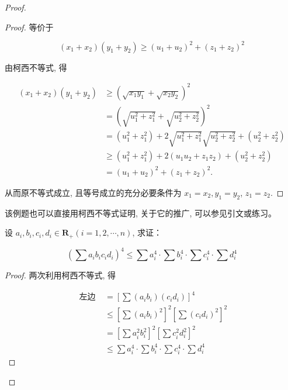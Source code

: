 \begin{proof}
\begin{proof}
	等价于
	
	$$
	\left(x_{1}+x_{2}\right)\left(y_{1}+y_{2}\right) \geqslant\left(u_{1}+u_{2}\right)^{2}+\left(z_{1}+z_{2}\right)^{2}
	$$
	
	由柯西不等式, 得
	
	$$
	\begin{aligned}
	\left(x_{1}+x_{2}\right)\left(y_{1}+y_{2}\right) & \geqslant\left(\sqrt{x_{1} y_{1}}+\sqrt{x_{2} y_{2}}\right)^{2} \\
	& =\left(\sqrt{u_{1}^{2}+z_{1}^{2}}+\sqrt{u_{2}^{2}+z_{2}^{2}}\right)^{2} \\
	& =\left(u_{1}^{2}+z_{1}^{2}\right)+2 \sqrt{u_{1}^{2}+z_{1}^{2}} \sqrt{u_{2}^{2}+z_{2}^{2}}+\left(u_{2}^{2}+z_{2}^{2}\right) \\
	& \geqslant\left(u_{1}^{2}+z_{1}^{2}\right)+2\left(u_{1} u_{2}+z_{1} z_{2}\right)+\left(u_{2}^{2}+z_{2}^{2}\right) \\
	& =\left(u_{1}+u_{2}\right)^{2}+\left(z_{1}+z_{2}\right)^{2} .
	\end{aligned}
	$$
	
	从而原不等式成立, 且等号成立的充分必要条件为 $x_{1}=x_{2}, y_{1}=y_{2}$, $z_{1}=z_{2}$.
\end{proof}
\begin{note}
	该例题也可以直接用柯西不等式证明, 关于它的推广, 可以参见引文或练习。
\end{note}

\begin{example}
	设 $a_{i}, b_{i}, c_{i}, d_{i} \in \mathbf{R}_{+}(i=1,2, \cdots, n)$, 求证：
	
	$$
	\left(\sum a_{i} b_{i} c_{i} d_{i}\right)^{4} \leqslant \sum a_{i}^{4} \cdot \sum b_{i}^{4} \cdot \sum c_{i}^{4} \cdot \sum d_{i}^{4}
	$$
\end{example}
\begin{proof}
	两次利用柯西不等式, 得
	
	$$
	\begin{aligned}
	\text { 左边 } & =\left[\sum\left(a_{i} b_{i}\right)\left(c_{i} d_{i}\right)\right]^{4} \\
	& \leqslant\left[\sum\left(a_{i} b_{i}\right)^{2}\right]^{2}\left[\sum\left(c_{i} d_{i}\right)^{2}\right]^{2} \\
	& =\left[\sum a_{i}^{2} b_{i}^{2}\right]^{2}\left[\sum c_{i}^{2} d_{i}^{2}\right]^{2} \\
	& \leqslant \sum a_{i}^{4} \cdot \sum b_{i}^{4} \cdot \sum c_{i}^{4} \cdot \sum d_{i}^{4}
	\end{aligned}
	$$
	

\end{proof}
\end{proof}
